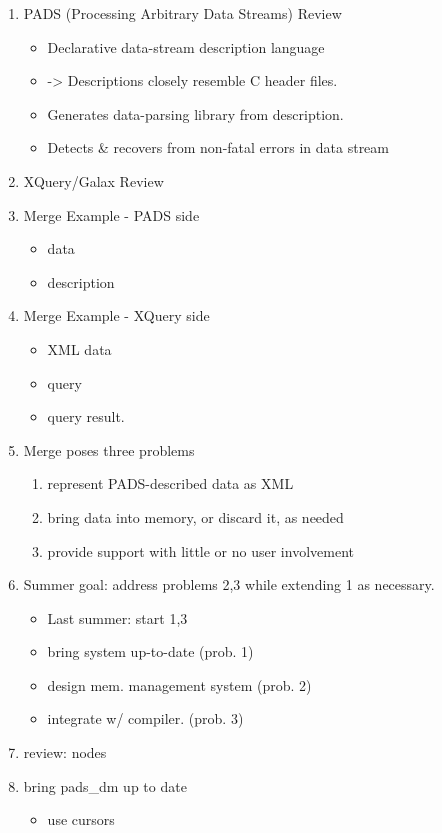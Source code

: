 \documentclass{article}
\begin{document}
\begin{enumerate}
\item PADS (Processing Arbitrary Data Streams) Review
  \begin{itemize}
  \item Declarative data-stream description language
  \item -> Descriptions closely resemble C header files.
  \item Generates data-parsing library from description.
  \item Detects \& recovers from non-fatal errors in data stream
  \end{itemize}
\item XQuery/Galax Review
\item Merge Example - PADS side
  \begin{itemize}
  \item data
  \item description
  \end{itemize}
\item Merge Example - XQuery side
  \begin{itemize}
  \item XML data
  \item query
  \item query result.
  \end{itemize}
\item Merge poses three problems
  \begin{enumerate}
  \item represent PADS-described data as XML
  \item bring data into memory, or discard it, as needed
  \item provide support with little or no user involvement
  \end{enumerate}
\item Summer goal: address problems 2,3 while extending 1 as
  necessary.
  \begin{itemize}
  \item Last summer: start 1,3
  \item bring system up-to-date (prob. 1)
  \item design mem. management system (prob. 2)
  \item integrate w/ compiler. (prob. 3)
  \end{itemize}
\item review: nodes
\item bring pads\_dm up to date
  \begin{itemize}
  \item use cursors

\end{itemize}
\end{enumerate}
\end{document}

